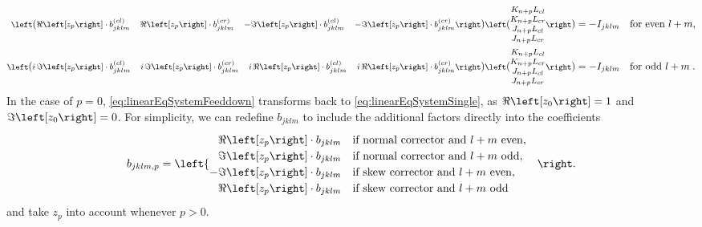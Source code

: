 \begin{equation}
    \label{eq:linearEqSystemFeeddown}
    \begin{split}
    \footnotesize
    \begin{pmatrix}
        \ReOf{z_p} \cdot b_{jklm}^{(cl)} & 
        \ReOf{z_p} \cdot b_{jklm}^{(cr)} & 
        -\ImOf{z_p} \cdot b_{jklm}^{(cl)} &
        -\ImOf{z_p} \cdot b_{jklm}^{(cr)}
    \end{pmatrix}
    \begin{pmatrix}
        K_{n+p}L_{cl} \\ 
        K_{n+p}L_{cr} \\ 
        J_{n+p}L_{cl} \\ 
        J_{n+p}L_{cr}
    \end{pmatrix}
     &= -
     I_{jklm} \quad
    \text{for even } l+m, 
     \\
    \footnotesize
    \begin{pmatrix}
        i \,\ImOf{z_p} \cdot b_{jklm}^{(cl)} & 
        i \,\ImOf{z_p} \cdot b_{jklm}^{(cr)} & 
        i \,\ReOf{z_p} \cdot b_{jklm}^{(cl)} & 
        i \,\ReOf{z_p} \cdot b_{jklm}^{(cr)}
    \end{pmatrix}
    \begin{pmatrix}
        K_{n+p}L_{cl} \\ 
        K_{n+p}L_{cr} \\ 
        J_{n+p}L_{cl} \\
        J_{n+p}L_{cr}
    \end{pmatrix}
     &=  
     -I_{jklm} \quad
    \text{for odd } l+m \; .
    \end{split}
\end{equation}
%
In the case of $p = 0$, \cref{eq:linearEqSystemFeeddown} transforms back to \cref{eq:linearEqSystemSingle},
as $\ReOf{z_0} = 1$ and $\ImOf{z_0} = 0$. 
For simplicity, we can redefine $b_{jklm}$ to include the additional factors directly into the coefficients 
\begin{equation}
    \label{eq:coefficientWithFeeddown}
    b_{jklm,p} =
    \begin{cases}
      \phantom{-} \ReOf{z_p} \cdot b_{jklm}   \quad \text{if normal corrector and } l + m \text{ even}, \\
     \phantom{-} \ImOf{z_p} \cdot b_{jklm}    \quad \text{if normal corrector and } l + m \text{ odd}, \\    
      -\ImOf{z_p} \cdot b_{jklm}              \quad \text{if skew corrector and } l + m \text{ even}, \\    
       \phantom{-} \ReOf{z_p}  \cdot b_{jklm} \quad \text{if skew corrector and } l + m \text{ odd} 
    \end{cases}
\end{equation}
%
and take $z_p$ into account whenever $p>0$.

